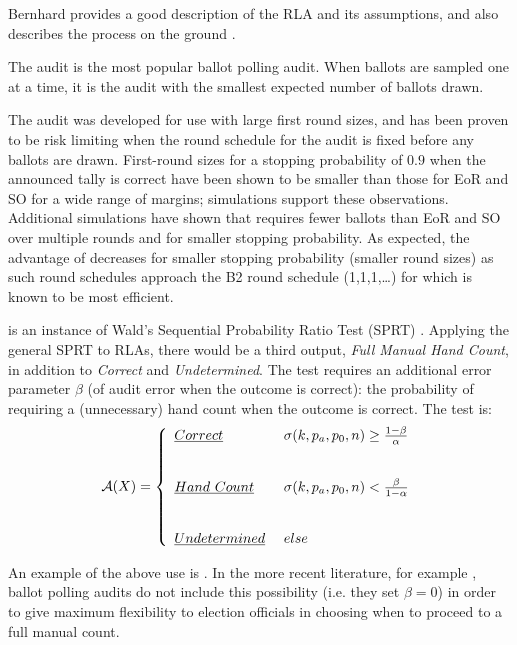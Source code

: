 Bernhard provides a good description of the RLA and its assumptions, and also describes the process on the ground \cite{bernhard-sok}. 

The \BRAVO audit \cite{bravo} is the most popular ballot polling audit. When ballots are sampled one at a time, it is the audit with the smallest expected number of ballots drawn. 

The \Minerva audit \cite{usenix_minerva,arxiv_athena} was developed for use with large first round sizes, and has been proven to be risk limiting when the round schedule for the audit is fixed before any ballots are drawn. First-round sizes for a stopping probability of $0.9$ when the announced tally is correct have been shown to be smaller than those for EoR and SO \BRAVO for a wide range of margins; simulations \cite{arxiv_athena} support these observations. Additional simulations \cite{simulations} have shown that \Minerva requires fewer ballots than EoR and SO \BRAVO over multiple rounds and for smaller stopping probability. As expected, the advantage of \Minerva decreases for smaller stopping probability (smaller round sizes) as such round schedules approach the B2 round schedule (1,1,1,\ldots) for which \BRAVO is known to be most efficient.

\BRAVO is an instance of Wald's Sequential Probability Ratio Test (SPRT) \cite{wald}. Applying the general SPRT to RLAs, there would be a third output, {\em Full Manual Hand Count}, in addition to {\em Correct} and {\em Undetermined}. The test requires an additional error parameter $\beta$ (of audit error when the outcome is correct): the probability of requiring a (unnecessary) hand count when the outcome is correct. The test is:
\begin{equation}
    \mathcal{A}(X) =  \left\{ \begin{array}{ll} \emph{Correct} & ~\sigma(k, p_a, p_0, n) 
        \geq \frac{1-\beta}{\alpha}\\ \\ \\
       \emph{Hand~Count} & ~\sigma(k, p_a, p_0, n) 
        < \frac{\beta}{1-\alpha}\\ \\ \\
        \emph{Undetermined} & ~else 
    \end{array}
    \right .
    \label{eqn:wald}
\end{equation}

An example of the above use is \cite{RLA}. In the more recent literature, for example \cite{bravo}, ballot polling audits do not include this possibility (i.e. they set $\beta=0$) in order to give maximum flexibility to election officials in choosing when to proceed to a full manual count.

